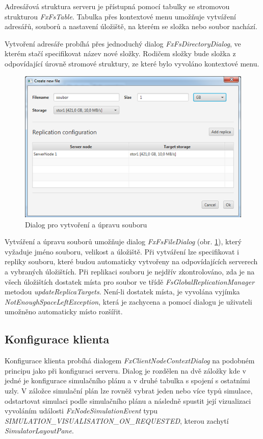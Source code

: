 \documentclass[czech,DP]{thesiskiv}
\begin{document}
Adresářová struktura serveru je přístupná pomocí tabulky se stromovou strukturou \textit{FxFsTable}. Tabulka přes kontextové menu umožňuje vytváření adresářů, souborů a nastavení úložiště, na kterém se složka nebo soubor nachází. 

Vytvoření adresáře probíhá přes jednoduchý dialog \textit{FxFsDirectoryDialog}, ve kterém stačí specifikovat název nové složky. Rodičem složky bude složka z odpovídající úrovně stromové struktury, ze které bylo vyvoláno kontextové menu.

\begin{figure}
\centering
	\includegraphics{img/vytvareni_soubor.png}
\caption{Dialog pro vytvoření a úpravu souboru}
\label{fig:vytvareni_soubor}
\end{figure}

Vytváření a úpravu souborů umožňuje dialog \textit{FxFsFileDialog} (obr. \ref{fig:vytvareni_soubor}), který vyžaduje jméno souboru, velikost a úložiště. Při vytváření lze specifikovat i repliky souboru, které budou automaticky vytvořeny na odpovídajících serverech a vybraných úložištích. Při replikaci souboru je nejdřív zkontrolováno, zda je na všech úložištích dostatek místa pro soubor ve třídě \textit{FsGlobalReplicationManager} metodou \textit{updateReplicaTargets}. Není-li dostatek místa, je vyvolána vyjímka \textit{NotEnoughSpaceLeftException}, která je zachycena a pomocí dialogu je uživateli umožněno automaticky místo rozšířit.

\subsection{Konfigurace klienta}

Konfigurace klienta probíhá dialogem \textit{FxClientNodeContextDialog} na podobném principu jako při konfiguraci serveru. Dialog je rozdělen na dvě záložky kde v jedné je konfigurace simulačního plánu a v druhé tabulka s spojení s ostatními uzly. V záložce simulační plán lze rovněž vybrat jeden nebo více typů simulace, odstartovat simulaci podle simulačního plánu a následně spustit její vizualizaci vyvoláním události \textit{FxNodeSimulationEvent} typu \textit{SIMULATION\_VISUALISATION\_ON\_REQUESTED}, kterou zachytí \textit{SimulatorLayoutPane}.
\end{document}
